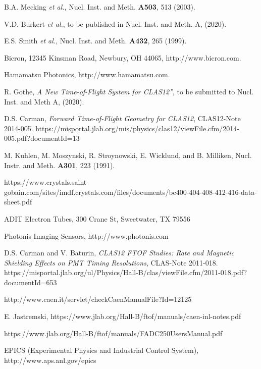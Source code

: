 \documentclass{elsart}
\begin{document}
\begin{thebibliography}{99}

B.A. Mecking {\it et al.}, Nucl. Inst. and Meth. {\bf A503}, 513 (2003).

V.D. Burkert {\it et al.}, to be published in Nucl. Inst. and Meth. A, (2020).
  
E.S. Smith {\it et al.}, Nucl. Inst. and Meth. {\bf A432}, 265 (1999).

Bicron, 12345 Kinsman Road, Newbury, OH 44065, http://www.bicron.com.

Hamamatsu Photonics, http://www.hamamatsu.com.
  
R. Gothe, {\it A New Time-of-Flight System for CLAS12''}, to be submitted to Nucl. Inst. and Meth A, (2020).

D.S. Carman, {\it Forward Time-of-Flight Geometry for CLAS12}, CLAS12-Note 2014-005.
https://misportal.jlab.org/mis/physics/clas12/viewFile.cfm/2014-005.pdf?documentId=13

M. Kuhlen, M. Moszynski, R. Stroynowski, E. Wicklund, and B. Milliken, Nucl.  Instr. and Meth.
{\bf A301}, 223 (1991).

https://www.crystals.saint-gobain.com/sites/imdf.crystals.com/files/documents/bc400-404-408-412-416-data-sheet.pdf

ADIT Electron Tubes, 300 Crane St, Sweetwater, TX 79556
  
Photonis Imaging Sensors, http://www.photonis.com

D.S. Carman and V. Baturin, {\it CLAS12 FTOF Studies: Rate and Magnetic Shielding Effects on PMT Timing
Resolutions}, CLAS-Note 2011-018.\\
https://misportal.jlab.org/ul/Physics/Hall-B/clas/viewFile.cfm/2011-018.pdf?documentId=653
  
http://www.caen.it/servlet/checkCaenManualFile?Id=12125
  
E. Jastremski, https://www.jlab.org/Hall-B/ftof/manuals/caen-inl-notes.pdf

https://www.jlab.org/Hall-B/ftof/manuals/FADC250UsersManual.pdf
  
EPICS (Experimental Physics and Industrial Control System),\\ http://www.aps.anl.gov/epics


\end{thebibliography}
\end{document}
